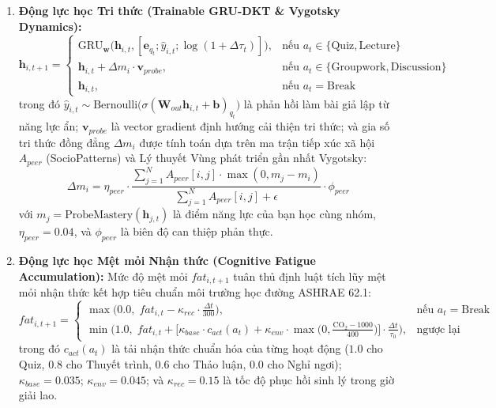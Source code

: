 \begin{enumerate}[label=\textbf{\arabic*.}]
  \item \textbf{Động lực học Tri thức (Trainable GRU-DKT \& Vygotsky Dynamics):}
  \begin{equation}\label{eq:knowledge-transition}
    \mathbf{h}_{i, t+1} = \begin{cases}
      \text{GRU}_{\mathbf{w}}\big(\mathbf{h}_{i, t}, [\mathbf{e}_{q_t}; \hat{y}_{i, t}; \log(1 + \Delta \tau_t)]\big), & \text{nếu } a_t \in \{\text{Quiz}, \text{Lecture}\} \\
      \mathbf{h}_{i, t} + \Delta m_i \cdot \mathbf{v}_{probe}, & \text{nếu } a_t \in \{\text{Groupwork}, \text{Discussion}\} \\
      \mathbf{h}_{i, t}, & \text{nếu } a_t = \text{Break}
    \end{cases}
  \end{equation}
  trong đó $\hat{y}_{i, t} \sim \text{Bernoulli}\big(\sigma(\mathbf{W}_{out}\mathbf{h}_{i, t} + \mathbf{b})_{q_t}\big)$ là phản hồi làm bài giả lập từ năng lực ẩn; $\mathbf{v}_{probe}$ là vector gradient định hướng cải thiện tri thức; và gia số tri thức đồng đẳng $\Delta m_i$ được tính toán dựa trên ma trận tiếp xúc xã hội $A_{peer}$ (SocioPatterns) và Lý thuyết Vùng phát triển gần nhất Vygotsky:
  \begin{equation}\label{eq:peer-gain}
    \Delta m_i = \eta_{peer} \cdot \frac{\sum_{j=1}^N A_{peer}[i, j] \cdot \max(0, m_j - m_i)}{\sum_{j=1}^N A_{peer}[i, j] + \epsilon} \cdot \phi_{peer}
  \end{equation}
  với $m_j = \text{ProbeMastery}(\mathbf{h}_{j, t})$ là điểm năng lực của bạn học cùng nhóm, $\eta_{peer} = 0.04$, và $\phi_{peer}$ là biên độ can thiệp phản thực.

  \item \textbf{Động lực học Mệt mỏi Nhận thức (Cognitive Fatigue Accumulation):}
  Mức độ mệt mỏi $fat_{i, t+1}$ tuân thủ định luật tích lũy mệt mỏi nhận thức kết hợp tiêu chuẩn môi trường học đường ASHRAE 62.1:
  \begin{equation}\label{eq:fatigue-transition}
    fat_{i, t+1} = \begin{cases}
      \max\Big(0.0, \; fat_{i, t} - \kappa_{rec} \cdot \frac{\Delta t}{300}\Big), & \text{nếu } a_t = \text{Break} \\
      \min\bigg(1.0, \; fat_{i, t} + \Big[\kappa_{base} \cdot c_{act}(a_t) + \kappa_{env} \cdot \max\Big(0, \frac{\text{CO}_2 - 1000}{400}\Big)\Big] \cdot \frac{\Delta t}{\tau_0}\bigg), & \text{ngược lại}
    \end{cases}
  \end{equation}
  trong đó $c_{act}(a_t)$ là tải nhận thức chuẩn hóa của từng hoạt động ($1.0$ cho Quiz, $0.8$ cho Thuyết trình, $0.6$ cho Thảo luận, $0.0$ cho Nghỉ ngơi); $\kappa_{base} = 0.035$; $\kappa_{env} = 0.045$; và $\kappa_{rec} = 0.15$ là tốc độ phục hồi sinh lý trong giờ giải lao.


\end{enumerate}
